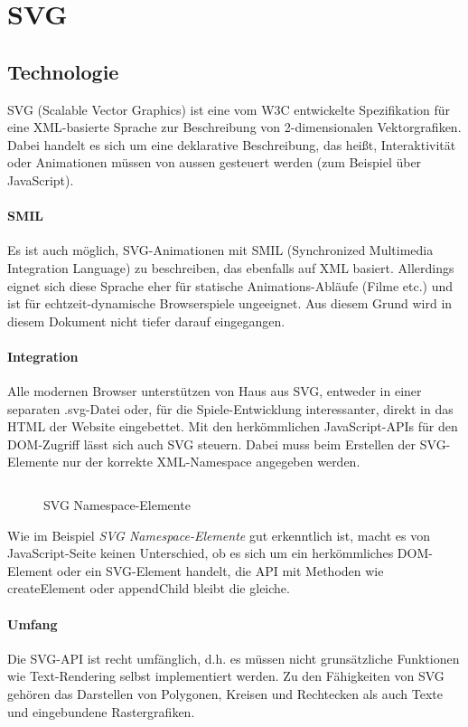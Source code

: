 \documentclass[a4paper, 12pt]{article}
\begin{document}
\section{SVG}
\subsection{Technologie}
SVG (Scalable Vector Graphics) ist eine vom W3C entwickelte Spezifikation für eine XML-basierte Sprache zur Beschreibung von 2-dimensionalen Vektorgrafiken. Dabei handelt es sich um eine deklarative Beschreibung, das heißt, Interaktivität oder Animationen müssen von aussen gesteuert werden (zum Beispiel über JavaScript).
\paragraph{SMIL} Es ist auch möglich, SVG-Animationen mit SMIL (Synchronized Multimedia Integration Language) zu beschreiben, das ebenfalls auf XML basiert. Allerdings eignet sich diese Sprache eher für statische Animations-Abläufe (Filme etc.) und ist für echtzeit-dynamische Browserspiele ungeeignet. Aus diesem Grund wird in diesem Dokument nicht tiefer darauf eingegangen.
\paragraph{Integration} Alle modernen Browser unterstützen von Haus aus SVG, entweder in einer separaten .svg-Datei oder, für die Spiele-Entwicklung interessanter, direkt in das HTML der Website eingebettet. Mit den herkömmlichen JavaScript-APIs für den DOM-Zugriff lässt sich auch SVG steuern. Dabei muss beim Erstellen der SVG-Elemente nur der korrekte XML-Namespace angegeben werden.
\begin{figure}[h!]
	\inputminted{javascript}{assets/svg_example.js}
	\caption{SVG Namespace-Elemente}
	\label{svg_namespace_example}
\end{figure}
Wie im Beispiel \emph{SVG Namespace-Elemente} gut erkenntlich ist, macht es von JavaScript-Seite keinen Unterschied, ob es sich um ein herkömmliches DOM-Element oder ein SVG-Element handelt, die API mit Methoden wie createElement oder appendChild bleibt die gleiche.
\paragraph{Umfang} Die SVG-API ist recht umfänglich, d.h. es müssen nicht grunsätzliche Funktionen wie Text-Rendering selbst implementiert werden. Zu den Fähigkeiten von SVG gehören das Darstellen von Polygonen, Kreisen und Rechtecken als auch Texte und eingebundene Rastergrafiken.
\end{document}
